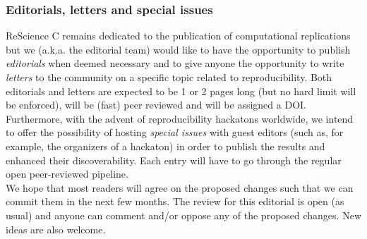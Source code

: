 \subsubsection{Editorials, letters and special issues}

ReScience C remains dedicated to the publication of computational replications
but we (a.k.a. the editorial team) would like to have the opportunity to
publish \emph{editorials} when deemed necessary and to give anyone the
opportunity to write \emph{letters} to the community on a specific topic
related to reproducibility. Both editorials and letters are expected to be 1 or
2 pages long (but no hard limit will be enforced), will be (fast) peer reviewed
and will be assigned a DOI. Furthermore, with the advent of reproducibility
hackatons worldwide, we intend to offer the possibility of hosting {\em special
  issues} with guest editors (such as, for example, the organizers of a
hackaton) in order to publish the results and enhanced their
discoverability. Each entry will have to go through the regular open
peer-reviewed pipeline.\\


We hope that most readers will agree on the proposed changes such that we can
commit them in the next few months. The review for this editorial is open (as
usual) and anyone can comment and/or oppose any of the proposed changes. New
ideas are also welcome.
